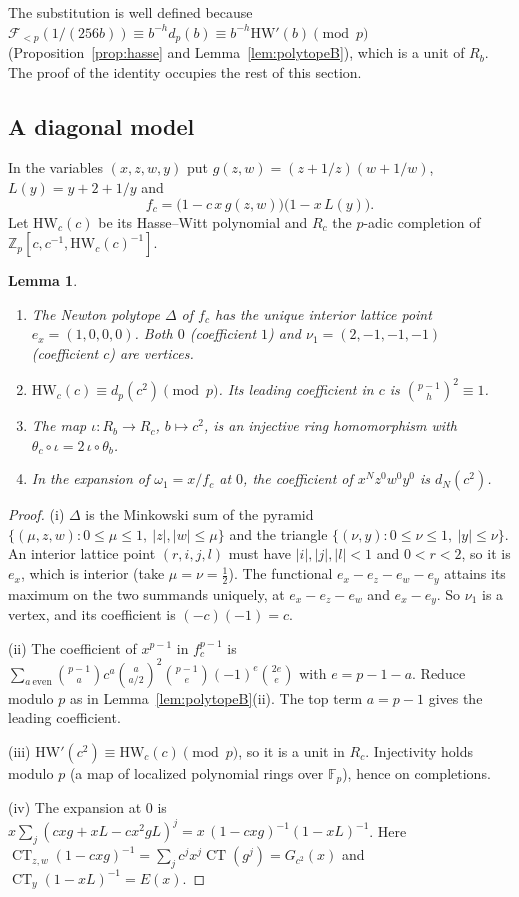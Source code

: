 \documentclass[11pt]{amsart}
\newtheorem{lemma}[theorem]{Lemma}
\theoremstyle{definition}
\theoremstyle{remark}
\newcommand{\F}{\mathbb{F}}
\newcommand{\Zp}{\mathbb{Z}_p}
\newcommand{\CT}{\operatorname{CT}}
\newcommand{\cF}{\mathcal{F}}
\begin{document}
The substitution is well defined because
$\cF_{<p}(1/(256b))\equiv b^{-h}d_p(b)\equiv b^{-h}\mathrm{HW}'(b)\pmod p$
(Proposition~\ref{prop:hasse} and Lemma~\ref{lem:polytopeB}), which is a unit of $R_b$. The proof
of the identity occupies the rest of this section.

\subsection{A diagonal model}
In the variables $(x,z,w,y)$ put $g(z,w)=(z+1/z)(w+1/w)$, $L(y)=y+2+1/y$ and
\[
 f_c=\bigl(1-c\,x\,g(z,w)\bigr)\bigl(1-x\,L(y)\bigr).
\]
Let $\mathrm{HW}_c(c)$ be its Hasse--Witt polynomial and $R_c$ the $p$-adic completion of
$\Zp[c,c^{-1},\mathrm{HW}_c(c)^{-1}]$.

\begin{lemma}\label{lem:polytopeC}
\begin{enumerate}[label=(\roman*)]
\item The Newton polytope $\Delta$ of $f_c$ has the unique interior lattice point $e_x=(1,0,0,0)$.
Both $0$ (coefficient $1$) and $\nu_1=(2,-1,-1,-1)$ (coefficient $c$) are vertices.
\item $\mathrm{HW}_c(c)\equiv d_p(c^2)\pmod p$. Its leading coefficient in $c$ is
$\binom{p-1}h^2\equiv1$.
\item The map $\iota:R_b\to R_c$, $b\mapsto c^2$, is an injective ring homomorphism with
$\theta_c\circ\iota=2\,\iota\circ\theta_b$.
\item In the expansion of $\omega_1=x/f_c$ at $0$, the coefficient of $x^Nz^0w^0y^0$ is $d_N(c^2)$.
\end{enumerate}
\end{lemma}
\begin{proof}
(i) $\Delta$ is the Minkowski sum of the pyramid $\{(\mu,z,w):0\le\mu\le1,\ |z|,|w|\le\mu\}$ and
the triangle $\{(\nu,y):0\le\nu\le1,\ |y|\le\nu\}$. An interior lattice point $(r,i,j,l)$ must have
$|i|,|j|,|l|<1$ and $0<r<2$, so it is $e_x$, which is interior (take $\mu=\nu=\frac12$). The
functional $e_x-e_z-e_w-e_y$ attains its maximum on the two summands uniquely, at
$e_x-e_z-e_w$ and $e_x-e_y$. So $\nu_1$ is a vertex, and its coefficient is
$(-c)(-1)=c$.

(ii) The coefficient of $x^{p-1}$ in $f_c^{p-1}$ is
$\sum_{a\ \mathrm{even}}\binom{p-1}a c^a\binom a{a/2}^2\binom{p-1}{e}(-1)^{e}\binom{2e}e$ with
$e=p-1-a$. Reduce modulo $p$ as in Lemma~\ref{lem:polytopeB}(ii). The top term $a=p-1$ gives the
leading coefficient.

(iii) $\mathrm{HW}'(c^2)\equiv\mathrm{HW}_c(c)\pmod p$, so it is a unit in $R_c$. Injectivity
holds modulo $p$ (a map of localized polynomial rings over $\F_p$), hence on completions.

(iv) The expansion at $0$ is $x\sum_j(cxg+xL-cx^2gL)^j=x\,(1-cxg)^{-1}(1-xL)^{-1}$. Here
$\CT_{z,w}(1-cxg)^{-1}=\sum_jc^jx^j\CT(g^j)=G_{c^2}(x)$ and $\CT_y(1-xL)^{-1}=E(x)$.
\end{proof}
\end{document}
